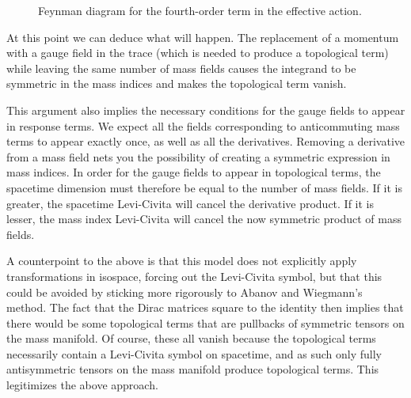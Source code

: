 \begin{figure}[!ht]
	\centering
	\caption{Feynman diagram for the fourth-order term in the effective action.}
	\label{fig:fourth_order_1d_fd}
\end{figure}

At this point we can deduce what will happen. The replacement of a momentum with a gauge field in the trace (which is needed to produce a topological term) while leaving the same number of mass fields causes the integrand to be symmetric in the mass indices and makes the topological term vanish.

This argument also implies the necessary conditions for the gauge fields to appear in response terms. We expect all the fields corresponding to anticommuting mass terms to appear exactly once, as well as all the derivatives. Removing a derivative from a mass field nets you the possibility of creating a symmetric expression in mass indices. In order for the gauge fields to appear in topological terms, the spacetime dimension must therefore be equal to the number of mass fields. If it is greater, the spacetime Levi-Civita will cancel the derivative product. If it is lesser, the mass index Levi-Civita will cancel the now symmetric product of mass fields.

A counterpoint to the above is that this model does not explicitly apply transformations in isospace, forcing out the Levi-Civita symbol, but that this could be avoided by sticking more rigorously to Abanov and Wiegmann's method. The fact that the Dirac matrices square to the identity then implies that there would be some topological terms that are pullbacks of symmetric tensors on the mass manifold. Of course, these all vanish because the topological terms necessarily contain a Levi-Civita symbol on spacetime, and as such only fully antisymmetric tensors on the mass manifold produce topological terms. This legitimizes the above approach.

